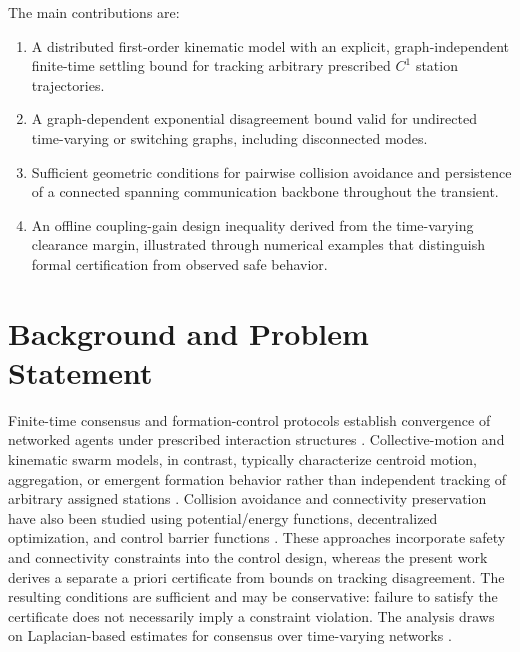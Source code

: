 \documentclass[letterpaper,10pt,conference]{ieeeconf}
\begin{document}
The main contributions are:
\begin{enumerate}
    \item A distributed first-order kinematic model with an explicit, graph-independent finite-time settling bound for tracking arbitrary prescribed $C^1$ station trajectories.
    \item A graph-dependent exponential disagreement bound valid for undirected time-varying or switching graphs, including disconnected modes.
    \item Sufficient geometric conditions for pairwise collision avoidance and persistence of a connected spanning communication backbone throughout the transient.
    \item An offline coupling-gain design inequality derived from the time-varying clearance margin, illustrated through numerical examples that distinguish formal certification from observed safe behavior.
\end{enumerate}

\section{Background and Problem Statement}
\label{sec:background}

Finite-time consensus and formation-control protocols establish convergence of networked agents under prescribed interaction structures \cite{xiao2009finite,wang2010finite}. Collective-motion and kinematic swarm models, in contrast, typically characterize centroid motion, aggregation, or emergent formation behavior rather than independent tracking of arbitrary assigned stations \cite{fedele2019kinematic}. Collision avoidance and connectivity preservation have also been studied using potential/energy functions, decentralized optimization, and control barrier functions \cite{chen2015connectivity,filotheou2020robust,fu2022distributed,huang2024prescribed}. These approaches incorporate safety and connectivity constraints into the control design, whereas the present work derives a separate a priori certificate from bounds on tracking disagreement. The resulting conditions are sufficient and may be conservative: failure to satisfy the certificate does not necessarily imply a constraint violation. The analysis draws on Laplacian-based estimates for consensus over time-varying networks \cite{olfati2004consensus,ren2005consensus}.
\end{document}
